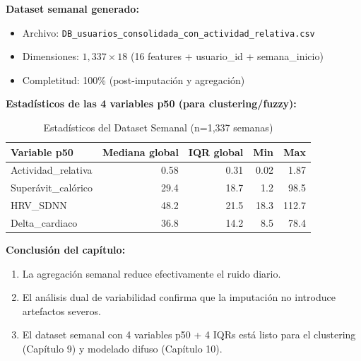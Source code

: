 \documentclass[12pt,letterpaper,twoside]{report}
\begin{document}
\begin{calculobox}
\textbf{Dataset semanal generado:}

\begin{itemize}[noitemsep]
    \item Archivo: \texttt{DB\_usuarios\_consolidada\_con\_actividad\_relativa.csv}
    \item Dimensiones: $1,337 \times 18$ (16 features + usuario\_id + semana\_inicio)
    \item Completitud: 100\% (post-imputación y agregación)
\end{itemize}

\textbf{Estadísticos de las 4 variables p50 (para clustering/fuzzy):}

\begin{table}[H]
\centering
\begin{tabular}{@{}lrrrr@{}}
\toprule
\textbf{Variable p50} & \textbf{Mediana global} & \textbf{IQR global} & \textbf{Min} & \textbf{Max} \\
\midrule
Actividad\_relativa     & 0.58 & 0.31 & 0.02 & 1.87 \\
Superávit\_calórico     & 29.4 & 18.7 & 1.2  & 98.5 \\
HRV\_SDNN               & 48.2 & 21.5 & 18.3 & 112.7 \\
Delta\_cardiaco         & 36.8 & 14.2 & 8.5  & 78.4 \\
\bottomrule
\end{tabular}
\caption{Estadísticos del Dataset Semanal (n=1,337 semanas)}
\label{tab:weekly_stats}
\end{table}
\end{calculobox}

\begin{conclusionbox}
\textbf{Conclusión del capítulo:}

\begin{enumerate}[noitemsep]
    \item La agregación semanal reduce efectivamente el ruido diario.
    \item El análisis dual de variabilidad confirma que la imputación no introduce artefactos severos.
    \item El dataset semanal con 4 variables p50 + 4 IQRs está listo para el clustering (Capítulo 9) y modelado difuso (Capítulo 10).
\end{enumerate}
\end{conclusionbox}

\end{document}
